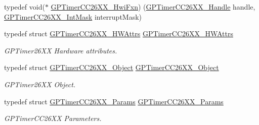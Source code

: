 \begin{DoxyCompactItemize}
\item 
typedef void($\ast$ \hyperlink{_g_p_timer_c_c26_x_x_8h_a6b9b95974e20f85ccd3f8463fdda84f1}{G\+P\+Timer\+C\+C26\+X\+X\+\_\+\+Hwi\+Fxn}) (\hyperlink{_g_p_timer_c_c26_x_x_8h_ab85403dde5940c587c57ca1a140e655a}{G\+P\+Timer\+C\+C26\+X\+X\+\_\+\+Handle} handle, \hyperlink{_g_p_timer_c_c26_x_x_8h_ac74410bfd92bf89732dd795bbe8769d1}{G\+P\+Timer\+C\+C26\+X\+X\+\_\+\+Int\+Mask} interrupt\+Mask)
\item 
typedef struct \hyperlink{struct_g_p_timer_c_c26_x_x___h_w_attrs}{G\+P\+Timer\+C\+C26\+X\+X\+\_\+\+H\+W\+Attrs} \hyperlink{_g_p_timer_c_c26_x_x_8h_a415d99f6aca4a4a8bf94a6328021c15c}{G\+P\+Timer\+C\+C26\+X\+X\+\_\+\+H\+W\+Attrs}
\begin{DoxyCompactList}\small\item\em G\+P\+Timer26\+X\+X Hardware attributes. \end{DoxyCompactList}\item 
typedef struct \hyperlink{struct_g_p_timer_c_c26_x_x___object}{G\+P\+Timer\+C\+C26\+X\+X\+\_\+\+Object} \hyperlink{_g_p_timer_c_c26_x_x_8h_a98c0a6722f2d48af3b7c032235181bd1}{G\+P\+Timer\+C\+C26\+X\+X\+\_\+\+Object}
\begin{DoxyCompactList}\small\item\em G\+P\+Timer26\+X\+X Object. \end{DoxyCompactList}\item 
typedef struct \hyperlink{struct_g_p_timer_c_c26_x_x___params}{G\+P\+Timer\+C\+C26\+X\+X\+\_\+\+Params} \hyperlink{_g_p_timer_c_c26_x_x_8h_ad5264b3636e1d40a6cbd64cf150be32d}{G\+P\+Timer\+C\+C26\+X\+X\+\_\+\+Params}
\begin{DoxyCompactList}\small\item\em G\+P\+Timer\+C\+C26\+X\+X Parameters. \end{DoxyCompactList}\end{DoxyCompactItemize}
